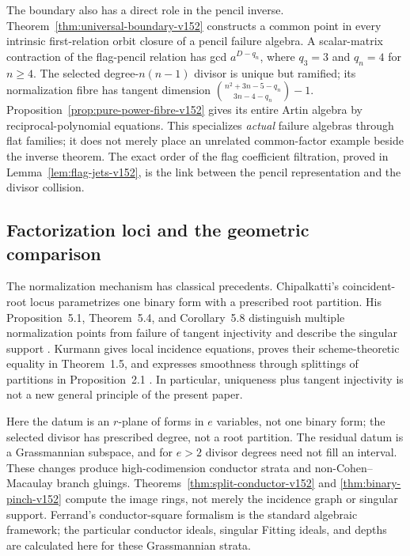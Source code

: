 \documentclass[11pt,reqno]{amsart}
\numberwithin{equation}{section}
\theoremstyle{definition}\newtheorem{definition}[theorem]{Definition}
\theoremstyle{remark}\newtheorem{remark}[theorem]{Remark}
\begin{document}
The boundary also has a direct role in the pencil inverse.
Theorem~\ref{thm:universal-boundary-v152} constructs a common point
in every intrinsic first-relation orbit closure of a pencil failure
algebra.  A scalar-matrix contraction of the flag-pencil relation
has gcd $a^{D-q_n}$, where $q_3=3$ and $q_n=4$ for $n\geq4$.
The selected degree-$n(n-1)$ divisor is unique but ramified; its
normalization fibre has tangent dimension
$\binom{n^2+3n-5-q_n}{3n-4-q_n}-1$.
Proposition~\ref{prop:pure-power-fibre-v152} gives its entire Artin
algebra by reciprocal-polynomial equations.  This specializes
\emph{actual} failure algebras through flat families; it does not
merely place an unrelated common-factor example beside the inverse
theorem.  The exact order of the flag coefficient filtration, proved
in Lemma~\ref{lem:flag-jets-v152}, is the link between the pencil
representation and the divisor collision.

\subsection{Factorization loci and the geometric comparison}
The normalization mechanism has classical precedents.
Chipalkatti's coincident-root locus parametrizes one binary form
with a prescribed root partition.  His Proposition~5.1, Theorem~5.4,
and Corollary~5.8 distinguish multiple normalization points from
failure of tangent injectivity and describe the singular support
\cite{Chipalkatti2003}.  Kurmann gives local incidence equations,
proves their scheme-theoretic equality in Theorem~1.5, and expresses
smoothness through splittings of partitions in Proposition~2.1
\cite{Kurmann2012}.  In particular, uniqueness plus tangent
injectivity is not a new general principle of the present paper.

Here the datum is an $r$-plane of forms in $e$ variables, not one
binary form; the selected divisor has prescribed degree, not a
root partition.  The residual datum is a Grassmannian subspace,
and for $e>2$ divisor degrees need not fill an interval.  These
changes produce high-codimension conductor strata and non-Cohen--Macaulay
branch gluings.  Theorems~\ref{thm:split-conductor-v152} and
\ref{thm:binary-pinch-v152} compute the image rings, not merely
the incidence graph or singular support.  Ferrand's conductor-square
formalism \cite{Ferrand2003} is the standard algebraic framework;
the particular conductor ideals, singular Fitting ideals, and depths
are calculated here for these Grassmannian strata.
\end{document}
